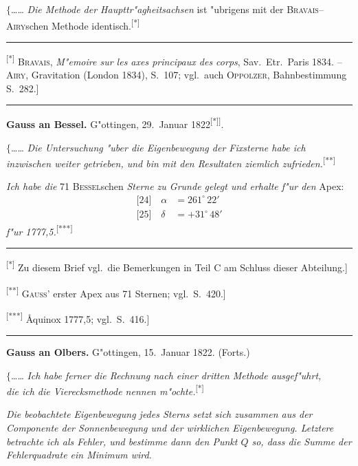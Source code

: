 \documentclass[12pt,a4paper]{article}
\theoremstyle{plain}
\theoremstyle{definition}
\theoremstyle{remark}
\newcommand{\besc}[1]{\textsc{#1}}
\begin{document}
\noindent
$\{$\ldots{}\ldots{} {\itshape Die Methode der Haupttr"agheitsachsen} ist "ubrigens mit der \besc{Bravais}--\besc{Airy}schen Methode identisch.\textsuperscript{[*]}

\rule{\textwidth}{0.4pt}
{\small
\textsuperscript{[*]} \textsc{Bravais}, {\itshape M"emoire sur les axes principaux des corps}, Sav.\ Etr.\ Paris 1834. -- \textsc{Airy}, Gravitation (London 1834), S.\ 107; vgl.\ auch \textsc{Oppolzer}, Bahnbestimmung S.\ 282.]
}
\rule{\textwidth}{0.4pt}

\vspace{1em}
\begin{center}
\textbf{Gauss an Bessel.} \quad G"ottingen, 29.\ Januar 1822\textsuperscript{[*]]}.
\end{center}

\noindent
$\{$\ldots{}\ldots{} {\itshape Die Untersuchung "uber die Eigenbewegung der Fixsterne habe ich} \\ {\itshape inzwischen weiter getrieben, und bin mit den Resultaten ziemlich zufrieden.}\textsuperscript{[**]}

{\itshape Ich habe die} 71 \textsc{Bessel}schen {\itshape Sterne zu Grunde gelegt und erhalte f"ur den} Apex:
\begin{align*}
\text{[24]}\quad \alpha &= 261^{\circ}\,22'\\
\text{[25]}\quad \delta &= +31^{\circ}\,48'
\end{align*}
{\itshape f"ur 1777,5.}\textsuperscript{[***]}

\rule{\textwidth}{0.4pt}
{\small
\textsuperscript{[*]} Zu diesem Brief vgl.\ die Bemerkungen in Teil C am Schluss dieser Abteilung.]

\textsuperscript{[**]} \textsc{Gauss'} erster Apex aus 71 Sternen; vgl.\ S.\ 420.]

\textsuperscript{[***]} \AA{}quinox 1777,5; vgl.\ S.\ 416.]
}
\rule{\textwidth}{0.4pt}

\vspace{1em}
\begin{center}
\textbf{Gauss an Olbers.} \quad G"ottingen, 15.\ Januar 1822. (Forts.)
\end{center}

\noindent
$\{$\ldots{}\ldots{} {\itshape Ich habe ferner die Rechnung nach einer dritten Methode ausgef"uhrt,} \\ {\itshape die ich die \glq{}Vierecksmethode\grq{} nennen m"ochte.}\textsuperscript{[*]}

{\itshape Die beobachtete Eigenbewegung jedes Sterns setzt sich zusammen aus der Componente der Sonnenbewegung und der wirklichen Eigenbewegung. Letztere betrachte ich als Fehler, und bestimme dann den Punkt $Q$ so, dass die Summe der Fehlerquadrate ein Minimum wird.}
\end{document}
